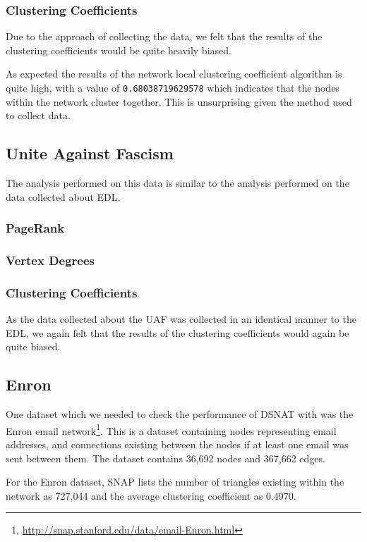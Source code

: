 \subsubsection{Clustering Coefficients}
Due to the approach of collecting the data, we felt that the results of the clustering coefficients would be quite heavily biased. 

As expected the results of the network local clustering coefficient algorithm is quite high, with a value of \verb/0.68038719629578/ which indicates that the nodes within the network cluster together. This is unsurprising given the method used to collect data.

\subsection{Unite Against Fascism}
The analysis performed on this data is similar to the analysis performed on the data collected about EDL.

\subsubsection{PageRank}

\subsubsection{Vertex Degrees}

\subsubsection{Clustering Coefficients}
As the data collected about the UAF was collected in an identical manner to the EDL, we again felt that the results of the clustering coefficients would again be quite biased.

\subsection{Enron}
One dataset which we needed to check the performance of DSNAT with was the Enron email network\footnote{\url{http://snap.stanford.edu/data/email-Enron.html}}. This is a dataset containing nodes representing email addresses, and connections existing between the nodes if at least one email was sent between them. The dataset contains 36,692 nodes and 367,662 edges.

For the Enron dataset, SNAP lists the number of triangles existing within the network as 727,044 and the average clustering coefficient as 0.4970. 

